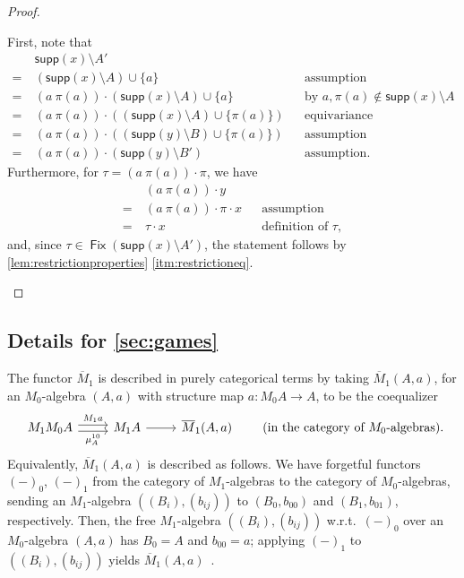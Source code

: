 \documentclass[11pt,a4paper]{amsart}
\newcommand{\supp}{\mathsf{supp}}
\newcommand{\Fix}{\mathop{\mathsf{Fix}}}
\newcommand{\mbar}{\overline{M}_1}
\theoremstyle{plain}
\numberwithin{equation}{section}
\newcommand{\+}[1]{\mathcal{#1}\xspace}
\theoremstyle{definition}
\begin{document}
\begin{proof}
\begin{itemize}
      First, note that
      \begin{align*}
        &\supp(x) \setminus A' \\
        =~&(\supp(x) \setminus A) \cup \{a\} && \text{assumption} \\
        =~&(a\ \pi(a)) \cdot (\supp(x) \setminus A) \cup \{a\} && \text{by } a,\pi(a) \notin \supp(x) \setminus A \\
        =~&(a\ \pi(a)) \cdot ((\supp(x) \setminus A) \cup \{\pi(a)\}) && \text{equivariance} \\
        =~&(a\ \pi(a)) \cdot ((\supp(y) \setminus B) \cup \{\pi(a)\}) && \text{assumption} \\
        =~&(a\ \pi(a)) \cdot (\supp(y) \setminus B') && \text{assumption}.
      \end{align*}
      Furthermore, for $\tau = (a\ \pi(a)) \cdot \pi$, we have
      \begin{align*}
        &(a\ \pi(a)) \cdot y \\
        =~&(a\ \pi(a)) \cdot \pi \cdot x && \text{assumption} \\
        =~&\tau \cdot x && \text{definition of } \tau,
      \end{align*}
      and, since $\tau \in \Fix(\supp(x) \setminus A')$, the statement follows by \cref{lem:restrictionproperties} \eqref{itm:restrictioneq}.
  \end{itemize}
\end{proof}

\subsection{Details for \cref{sec:games}}

The functor $\mbar$ is described in purely categorical terms by taking
$\mbar(A,a)$, for an $M_0$-algebra $(A,a)$ with structure map
$a\colon M_0A\to A$, to be the coequalizer
\begin{equation*}
  \begin{tikzcd}
    M_1M_0A \arrow[shift left,"M_1a",r] \arrow[shift right,"\mu^{10}_A" below,r] & M_1 A\arrow[r] &  \mbar(A,a)
  \end{tikzcd}\qquad\text{(in the category of $M_0$-algebras).}
\end{equation*}
Equivalently, $\mbar (A,a)$ is described as follows. We have forgetful
functors $(-)_0$, $(-)_1$ from the category of $M_1$-algebras to the
category of $M_0$-algebras, sending an $M_1$-algebra
$((B_i),(b_{ij}))$ to $(B_0,b_{00})$ and $(B_1,b_{01})$,
respectively. Then, the free $M_1$-algebra $((B_i),(b_{ij}))$ w.r.t.\
$(-)_0$ over an $M_0$-algebra $(A,a)$ has $B_0=A$ and $b_{00}=a$;
applying $(-)_1$ to $((B_i),(b_{ij}))$ yields
$\mbar(A,a)$~\cite{FordEA22,ForsterEA25a}.
\end{document}
